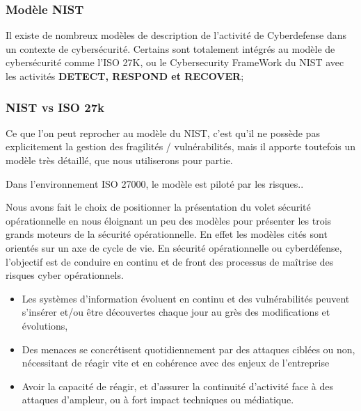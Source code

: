 \begin{frame}
\frametitle<presentation>{Modèle NIST}

Il existe de nombreux modèles de description de l'activité de Cyberdefense dans un contexte de cybersécurité.
Certains sont totalement intégrés au modèle de cybersécurité comme l'ISO 27K, ou le Cybersecurity FrameWork du NIST  avec les activités \textbf{DETECT, RESPOND et RECOVER};
\end{frame}


\begin{frame}
\frametitle<presentation>{NIST vs ISO 27k}
Ce que l'on peut reprocher au modèle du NIST, c'est qu'il ne possède pas explicitement la gestion des fragilités / vulnérabilités, mais il apporte toutefois un modèle très détaillé, que nous utiliserons pour partie.
\end{frame}
Dans l'environnement ISO 27000, le modèle est piloté par les risques..

Nous avons fait le choix de positionner la présentation du volet sécurité opérationnelle en nous éloignant un peu des modèles pour présenter les trois grands moteurs de la sécurité opérationnelle. En effet les modèles cités sont orientés sur un axe de cycle de vie.
En sécurité opérationnelle ou cyberdéfense, l'objectif est de conduire en continu et de front des processus de maîtrise des risques cyber opérationnels.
\begin{itemize}
  \item Les systèmes d'information évoluent en continu et des vulnérabilités peuvent s'insérer et/ou être découvertes chaque jour au grès des modifications et évolutions,
  \item Des menaces se concrétisent quotidiennement par des attaques ciblées ou non, nécessitant de réagir vite et en cohérence avec des enjeux de l'entreprise
  \item Avoir la capacité de réagir, et d'assurer la continuité d'activité face à des attaques d'ampleur, ou à fort impact techniques ou médiatique.
\end{itemize}

\newpage
